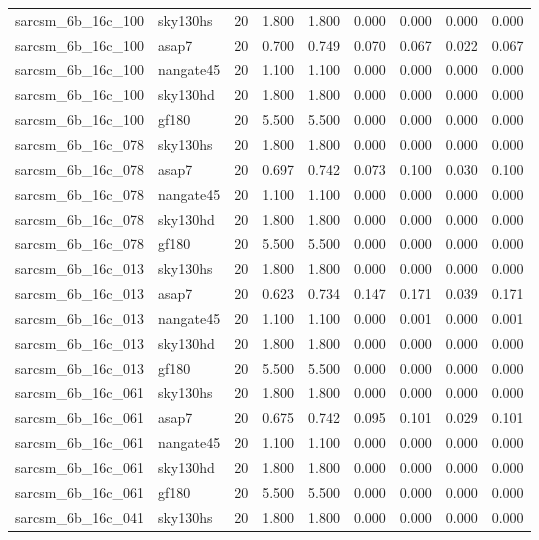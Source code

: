 \begin{tabular}{llrrrrrrr}
sarcsm\_6b\_16c\_100 & sky130hs & 20 & 1.800 & 1.800 & 0.000 & 0.000 & 0.000 & 0.000 \\
sarcsm\_6b\_16c\_100 & asap7 & 20 & 0.700 & 0.749 & 0.070 & 0.067 & 0.022 & 0.067 \\
sarcsm\_6b\_16c\_100 & nangate45 & 20 & 1.100 & 1.100 & 0.000 & 0.000 & 0.000 & 0.000 \\
sarcsm\_6b\_16c\_100 & sky130hd & 20 & 1.800 & 1.800 & 0.000 & 0.000 & 0.000 & 0.000 \\
sarcsm\_6b\_16c\_100 & gf180 & 20 & 5.500 & 5.500 & 0.000 & 0.000 & 0.000 & 0.000 \\
sarcsm\_6b\_16c\_078 & sky130hs & 20 & 1.800 & 1.800 & 0.000 & 0.000 & 0.000 & 0.000 \\
sarcsm\_6b\_16c\_078 & asap7 & 20 & 0.697 & 0.742 & 0.073 & 0.100 & 0.030 & 0.100 \\
sarcsm\_6b\_16c\_078 & nangate45 & 20 & 1.100 & 1.100 & 0.000 & 0.000 & 0.000 & 0.000 \\
sarcsm\_6b\_16c\_078 & sky130hd & 20 & 1.800 & 1.800 & 0.000 & 0.000 & 0.000 & 0.000 \\
sarcsm\_6b\_16c\_078 & gf180 & 20 & 5.500 & 5.500 & 0.000 & 0.000 & 0.000 & 0.000 \\
sarcsm\_6b\_16c\_013 & sky130hs & 20 & 1.800 & 1.800 & 0.000 & 0.000 & 0.000 & 0.000 \\
sarcsm\_6b\_16c\_013 & asap7 & 20 & 0.623 & 0.734 & 0.147 & 0.171 & 0.039 & 0.171 \\
sarcsm\_6b\_16c\_013 & nangate45 & 20 & 1.100 & 1.100 & 0.000 & 0.001 & 0.000 & 0.001 \\
sarcsm\_6b\_16c\_013 & sky130hd & 20 & 1.800 & 1.800 & 0.000 & 0.000 & 0.000 & 0.000 \\
sarcsm\_6b\_16c\_013 & gf180 & 20 & 5.500 & 5.500 & 0.000 & 0.000 & 0.000 & 0.000 \\
sarcsm\_6b\_16c\_061 & sky130hs & 20 & 1.800 & 1.800 & 0.000 & 0.000 & 0.000 & 0.000 \\
sarcsm\_6b\_16c\_061 & asap7 & 20 & 0.675 & 0.742 & 0.095 & 0.101 & 0.029 & 0.101 \\
sarcsm\_6b\_16c\_061 & nangate45 & 20 & 1.100 & 1.100 & 0.000 & 0.000 & 0.000 & 0.000 \\
sarcsm\_6b\_16c\_061 & sky130hd & 20 & 1.800 & 1.800 & 0.000 & 0.000 & 0.000 & 0.000 \\
sarcsm\_6b\_16c\_061 & gf180 & 20 & 5.500 & 5.500 & 0.000 & 0.000 & 0.000 & 0.000 \\
sarcsm\_6b\_16c\_041 & sky130hs & 20 & 1.800 & 1.800 & 0.000 & 0.000 & 0.000 & 0.000 \\

\end{tabular}
